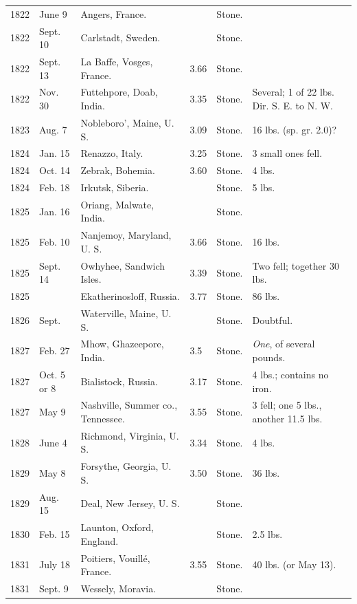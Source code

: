 \documentclass[a4paper, 12pt, oneside]{article}
\begin{document}
\begin{center}
\begin{longtable}{|p{10mm}|p{15mm}|p{32mm}|p{13mm}|p{13mm}|p{26mm}|}
        1822 & June 9 & Angers, France. & ~ & Stone. & ~ \\
        1822 & Sept. 10 & Carlstadt, Sweden. & ~ & Stone. & ~ \\
        1822 & Sept. 13 & La Baffe, Vosges, France. & 3.66 & Stone. & ~ \\
        1822 & Nov. 30 & Futtehpore, Doab, India. & 3.35 & Stone. & Several; 1 of 22 lbs. Dir. S. E. to N. W. \\
        1823 & Aug. 7 & Nobleboro’, Maine, U. S. & 3.09 & Stone. & 16 lbs. (sp. gr. 2.0)? \\
        1824 & Jan. 15 & Renazzo, Italy. & 3.25 & Stone. & 3 small ones fell. \\
        1824 & Oct. 14 & Zebrak, Bohemia. & 3.60 & Stone. & 4 lbs. \\
        1824 & Feb. 18 & Irkutsk, Siberia. & ~ & Stone. & 5 lbs. \\
        1825 & Jan. 16 & Oriang, Malwate, India. & ~ & Stone. & ~ \\
        1825 & Feb. 10 & Nanjemoy, Maryland, U. S. & 3.66 & Stone. & 16 lbs. \\
        1825 & Sept. 14 & Owhyhee, Sandwich Isles. & 3.39 & Stone. & Two fell; together 30 lbs. \\
        1825 & ~ & Ekatherinosloff, Russia. & 3.77 & Stone. & 86 lbs. \\
        1826 & Sept. & Waterville, Maine, U. S. & ~ & Stone. & Doubtful. \\
        1827 & Feb. 27 & Mhow, Ghazeepore, India. & 3.5 & Stone. & \emph{One}, of several pounds. \\
        1827 & Oct. 5 or 8 & Bialistock, Russia. & 3.17 & Stone. & 4 lbs.; contains no iron. \\
        1827 & May 9 & Nashville, Summer co., Tennessee. & 3.55 & Stone. & 3 fell; one 5 lbs., another 11.5 lbs. \\
        1828 & June 4 & Richmond, Virginia, U. S. & 3.34 & Stone. & 4 lbs. \\
        1829 & May 8 & Forsythe, Georgia, U. S. & 3.50 & Stone. & 36 lbs. \\
        1829 & Aug. 15 & Deal, New Jersey, U. S. & ~ & Stone. & ~ \\
        1830 & Feb. 15 & Launton, Oxford, England. & ~ & Stone. & 2.5 lbs. \\
        1831 & July 18 & Poitiers, Vouillé, France. & 3.55 & Stone. & 40 lbs. (or May 13). \\
        1831 & Sept. 9 & Wessely, Moravia. & ~ & Stone. & ~ \\

\end{longtable}
\end{center}
\end{document}
